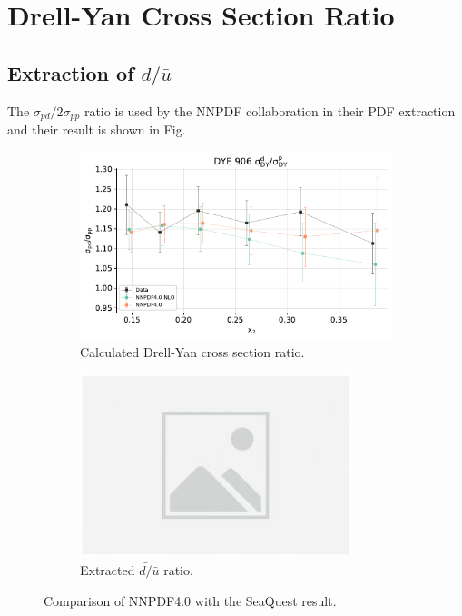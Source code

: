 \section{Drell-Yan Cross Section Ratio}

\subsection{Extraction of \texorpdfstring{$\bar{d}/\bar{u}$}{dbar/ubar}}
The $\sigma_{pd}/2\sigma_{pp}$ ratio is used by the NNPDF collaboration in 
their PDF extraction\cite{ball2021} and their result is shown in Fig.\ 

\begin{figure}[htbp!]
	\centering
	\begin{subfigure}{0.45\linewidth}
		\includegraphics[width=\linewidth]{images/data_vs_theory_nnpdf40_e906}
		\caption{Calculated Drell-Yan cross section ratio.}
		\label{subfig:nnpdf_e906_csr}
	\end{subfigure}
	\begin{subfigure}{0.45\linewidth}
		\includegraphics[width=\linewidth]{images/placeholder}
		\caption{Extracted $\bar{d/}\bar{u}$ ratio.}
		\label{subfig:nnpdf_e906_x2}
	\end{subfigure}
	\caption{Comparison of NNPDF4.0\cite{ball2021} with the SeaQuest 
	result\cite{dove2021}.}
	\label{fig:nnpdf_e906}
\end{figure}

